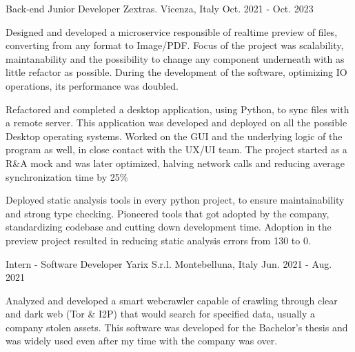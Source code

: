 

\begin{cventries}

  \cventry
    {Back-end Junior Developer} %
    {Zextras.} %
    {Vicenza, Italy} %
    {Oct. 2021 - Oct. 2023} %
    {
      \begin{cvitems} %
        \item {Designed and developed a microservice responsible of realtime preview of files, converting from any format to Image/PDF. Focus of the project was scalability, maintanability and the possibility to change any component underneath with as little refactor as possible. During the development of the software, optimizing IO operations, its performance was doubled.}
        \item {Refactored and completed a desktop application, using Python, to sync files with a remote server. This application was developed and deployed on all the possible Desktop operating systems. Worked on the GUI and the underlying logic of the program as well, in close contact with the UX/UI team. The project started as a R\&A mock and was later optimized, halving network calls and reducing average synchronization time by 25\%}
        \item {Deployed static analysis tools in every python project, to ensure maintainability and strong type checking. Pioneered tools that got adopted by the company, standardizing codebase and cutting down development time. Adoption in the preview project resulted in reducing static analysis errors from 130 to 0.}
      \end{cvitems}
    }

  \cventry
    {Intern - Software Developer} %
    {Yarix S.r.l.} %
    {Montebelluna, Italy} %
    {Jun. 2021 - Aug. 2021} %
    {
      \begin{cvitems} %
        \item {Analyzed and developed a smart webcrawler capable of crawling through clear and dark web (Tor \& I2P) that would search for specified data, usually a company stolen assets. This software was developed for the Bachelor's thesis and was widely used even after my time with the company was over.}
      \end{cvitems}
    }


\end{cventries}

